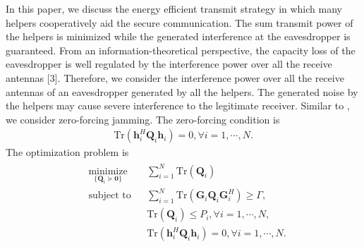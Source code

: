\documentclass[journal]{IEEEtran}
\begin{document}
In this paper, we discuss the energy efficient transmit strategy in which many helpers cooperatively aid the secure communication. The sum transmit power of the helpers is minimized while the generated interference at the eavesdropper is guaranteed. 
From an information-theoretical perspective,
the capacity loss of the eavesdropper is well regulated by the interference power over all the receive antennas [3]. Therefore, we consider the interference power over all the receive antennas of an eavesdropper generated by all the helpers. The generated noise by the helpers may cause severe interference to the legitimate receiver. Similar to \cite{huang_robust_2012}, we consider zero-forcing jamming. The zero-forcing condition is 
\begin{eqnarray}
\text{Tr}\left(\mathbf{h}_i^H\mathbf{Q}_i\mathbf{h}_i\right) = 0, \forall i = 1, \cdots, N.
\end{eqnarray}
The optimization problem is 
\begin{eqnarray}
\begin{aligned} \label{eq:sum_power}
& \underset{\{\mathbf{Q}_i \succeq \mathbf{0}\}}{\text{minimize}}
& & \sum_{i=1}^{N}\text{Tr}(\mathbf{Q}_i)\\
& \text{subject to}
& & \sum_{i=1}^{N}\text{Tr}\left(\mathbf{G}_i\mathbf{Q}_i\mathbf{G}_i^H\right) \geq \Gamma,\\
&&& \text{Tr}\left(\mathbf{Q}_i\right) \leq P_i, \forall i = 1,\cdots,N,\\
&&& \text{Tr}\left(\mathbf{h}_i^H\mathbf{Q}_i\mathbf{h}_i\right) = 0, \forall i = 1, \cdots, N.
\end{aligned}
\end{eqnarray}
\end{document}
